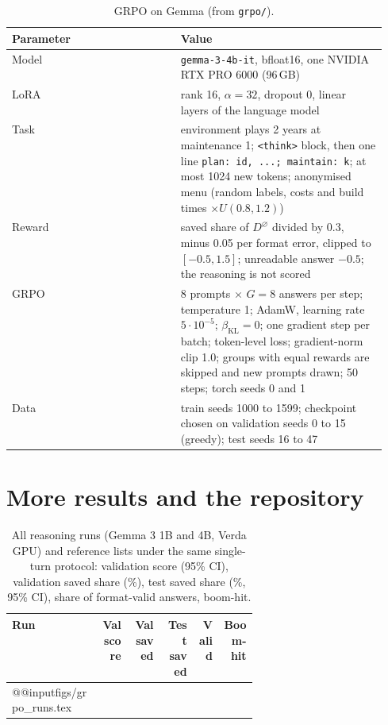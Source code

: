 \documentclass{article}
\begin{document}
\begin{table}[h]
\caption{GRPO on Gemma (from \texttt{grpo/}).}
\centering\small
\begin{tabular}{@{}lp{0.55\linewidth}@{}}
\toprule
Parameter & Value \\
\midrule
Model & \texttt{gemma-3-4b-it}, bfloat16, one NVIDIA RTX PRO 6000 (96\,GB) \\
LoRA & rank 16, $\alpha=32$, dropout 0, linear layers of the language model \\
Task & environment plays 2 years at maintenance 1; \texttt{<think>} block, then one line \texttt{plan: id, ...; maintain: k}; at most 1024 new tokens; anonymised menu (random labels, costs and build times $\times U(0.8,1.2)$) \\
Reward & saved share of $D^{\varnothing}$ divided by 0.3, minus 0.05 per format error, clipped to $[-0.5,1.5]$; unreadable answer $-0.5$; the reasoning is not scored \\
GRPO & 8 prompts $\times$ $G=8$ answers per step; temperature 1; AdamW, learning rate $5\cdot10^{-5}$; $\beta_{\text{KL}}=0$; one gradient step per batch; token-level loss; gradient-norm clip 1.0; groups with equal rewards are skipped and new prompts drawn; 50 steps; torch seeds 0 and 1 \\
Data & train seeds 1000 to 1599; checkpoint chosen on validation seeds 0 to 15 (greedy); test seeds 16 to 47 \\
\bottomrule
\end{tabular}
\end{table}

\section{More results and the repository}\label{app:more}

\begin{table}[h]
\caption{All reasoning runs (Gemma 3 1B and 4B, Verda GPU) and reference lists under the same single-turn protocol: validation score (95\% CI), validation saved share (\%), test saved share (\%, 95\% CI), share of format-valid answers, boom-hit.}
\label{tab:grporuns}
\centering\scriptsize
\begin{tabular}{@{}p{0.36\linewidth}rrrrr@{}}
\toprule
Run & Val score & Val saved & Test saved & Valid & Boom-hit \\
\midrule
\csname @@input\endcsname figs/grpo_runs.tex
\bottomrule
\end{tabular}
\end{table}
\end{document}

